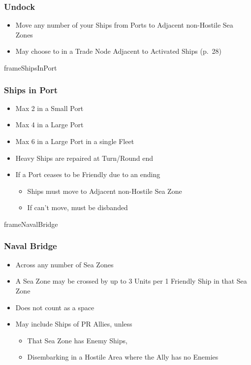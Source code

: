\documentclass[10pt]{article}
\begin{document}
\subsubsection*{Undock}
\begin{itemize}
	\item Move any number of your Ships from Ports to Adjacent non-Hostile Sea Zones
	\item May choose to  in a Trade Node Adjacent to Activated Ships (p.~28)
\end{itemize}

\begin{dynamiccontents*}{frameShipsInPort}
	\subsubsection*{Ships in Port }
	\begin{itemize}
		\item Max 2 in a Small Port
		\item Max 4 in a Large Port
		\item Max 6 in a Large Port in a single Fleet
		\item Heavy Ships are repaired at Turn/Round end
		\item If a Port ceases to be Friendly due to an ending \alliance
		\begin{itemize}
			\item Ships must move to Adjacent non-Hostile Sea Zone
			\item If can't move, must be disbanded 
		\end{itemize}
	\end{itemize}
\end{dynamiccontents*}

\begin{dynamiccontents*}{frameNavalBridge}
	\subsubsection*{Naval Bridge }
	\begin{itemize}
		\item Across any number of Sea Zones
		\item A Sea Zone may be crossed by up to 3 Units per 1 Friendly Ship in that Sea Zone
		\item Does not count as a space
		\item May include Ships of PR Allies, unless
		\begin{itemize}
			\item That Sea Zone has Enemy Ships, 
			\item Disembarking in a Hostile Area where the Ally has no Enemies
		\end{itemize}
	\end{itemize}
\end{dynamiccontents*}
\end{document}
